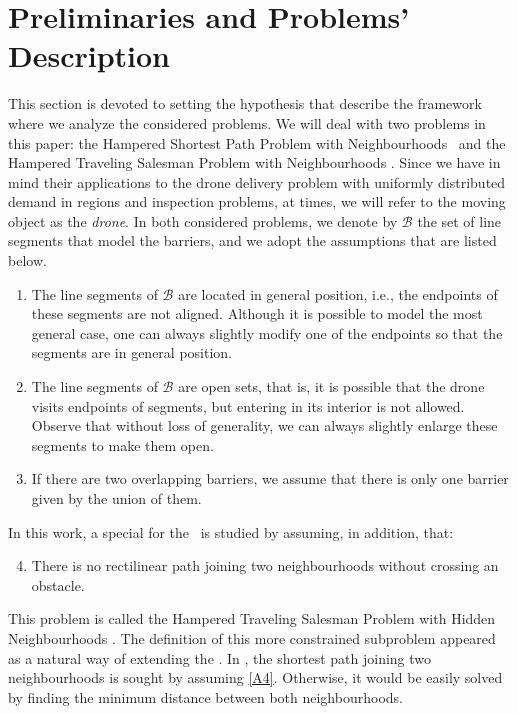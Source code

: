 \documentclass[a4paper,  review, authoryear, 1p.]{elsarticle}
\newcommand{\SPPN}{{\sf{H-SPPN}\xspace }}
\newcommand{\TSPHN}{{\sf{H-TSPHN}\xspace }}
\newcommand{\TSPN}{{\sf{H-TSPN}\xspace }}
\newcommand{\CV}[1]{{\color{red}#1}}
\begin{document}
		
		\section{Preliminaries and Problems'  Description \label{section:description}}
		This section is devoted to setting the hypothesis that describe the framework where we analyze the considered problems.
		We will deal with two problems in this paper: the Hampered Shortest Path Problem with Neighbourhoods \SPPN \ and the Hampered Traveling Salesman Problem with Neighbourhoods \TSPN. Since we have in mind their applications to the drone delivery problem with uniformly distributed demand in regions and inspection problems, at times, we will refer to the moving object as the \textit{drone}. In both considered problems, we denote by $\mathcal{B}$ the set of line segments that model the barriers, and we adopt the  assumptions that are listed below.
		
		\begin{enumerate}[label=\textbf{A\arabic*},ref=\textbf{A\arabic*}]
			\item \label{A1}The line segments of $\mathcal B$ are located in general position, i.e., the endpoints of these segments are not aligned. Although it is possible to model the most general case, one can always slightly modify one of the endpoints so that the segments are in general position.
			\item The line segments of $\mathcal B$ are open sets, that is, it is possible that the drone visits endpoints of segments, but entering  in its interior is not allowed. Observe that without loss of generality, we can always slightly enlarge these segments to make them open.
			\item \label{A3}If there are two overlapping barriers, we assume that there is only one barrier given by the union of them.
		\end{enumerate}

		\CV{In this work, a special for the \TSPN \ is studied by assuming, in addition, that:
		\begin{enumerate}[label=\textbf{A\arabic*}, ref=\textbf{A\arabic*}]
			\setcounter{enumi}{3}
			\item \label{A4}There is no rectilinear path joining two neighbourhoods without crossing an obstacle.
		\end{enumerate} 
		This problem is called the Hampered Traveling Salesman Problem with Hidden Neighbourhoods \TSPHN. The definition of this more constrained subproblem appeared as a natural way of extending the \SPPN. In \SPPN, the shortest path joining two neighbourhoods is sought by assuming \ref{A4}. Otherwise, it would be easily solved by finding the minimum distance between both neighbourhoods.

		}
\end{document}
